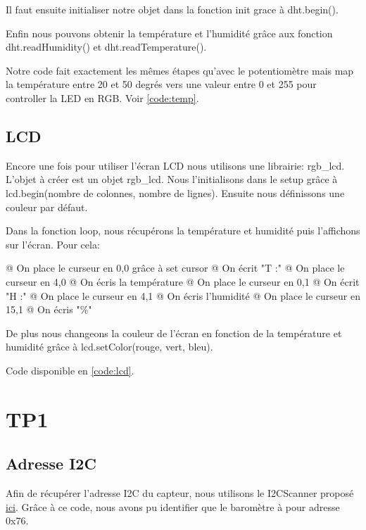 \documentclass{report}
\begin{document}
  			Il faut ensuite initialiser notre objet dans la fonction init grace à dht.begin().
  			
  			Enfin nous pouvons obtenir la température et l'humidité grâce aux fonction dht.readHumidity() et dht.readTemperature().
  			
  			Notre code fait exactement les mêmes étapes qu'avec le potentiomètre mais map la température entre 20 et 50 degrés vers une valeur entre 0 et 255 pour controller la LED en RGB.
  			Voir \autoref{code:temp}.
  			
  		\section{LCD}
  			Encore une fois pour utiliser l'écran LCD nous utilisons une librairie: rgb\_lcd.
  			L'objet à créer est un objet rgb\_lcd.
  			Nous l'initialisons dans le setup grâce à lcd.begin(nombre de colonnes, nombre de lignes).
  			Ensuite nous définissons une couleur par défaut.
  			
  			Dans la fonction loop, nous récupérons la température et humidité puis l'affichons sur l'écran.
  			Pour cela:
  			\begin{easylist}[itemize]
  				@ On place le curseur en 0,0 grâce à set cursor
  				@ On écrit "T :"
  				@ On place le curseur en 4,0
  				@ On écris la température
  				@ On place le curseur en 0,1
  				@ On écrit "H :"
  				@ On place le curseur en 4,1
  				@ On écris l'humidité
  				@ On place le curseur en 15,1
  				@ On écris "\%"
  			\end{easylist}
  			
  			De plus nous changeons la couleur de l'écran en fonction de la température et humidité grâce à lcd.setColor(rouge, vert, bleu).
  			
  			Code disponible en \autoref{code:lcd}.
  	
  	\chapter{TP1}
  		\section{Adresse I2C}
  			Afin de récupérer l'adresse I2C du capteur, nous utilisons le I2CScanner proposé \href{https://playground.arduino.cc/Main/I2cScanner}{ici}.
  			Grâce à ce code, nous avons pu identifier que le baromètre à pour adresse 0x76.
  			
\end{document}
